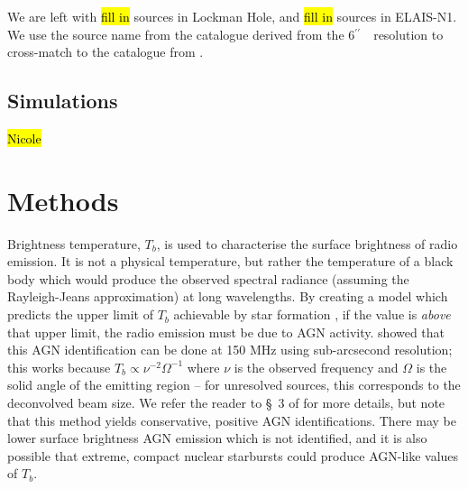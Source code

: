 \documentclass[usenatbib,fleqn,letters]{mnras}
\newcommand{\sarc}{$^{\prime\prime}\!\!$}
\begin{document}
We are left with \hl{fill in} sources in Lockman Hole, and \hl{fill in} sources in ELAIS-N1. We use the source name from the catalogue derived from the 6\sarc\ \ resolution to cross-match to the catalogue from . 

\subsection{Simulations}
\hl{Nicole}

\section{Methods}

Brightness temperature, $T_b$, is used to characterise the surface brightness of radio emission. It is not a physical temperature, but rather the temperature of a black body  which would produce the observed spectral radiance (assuming the Rayleigh-Jeans approximation) at long wavelengths. By creating a model which predicts the upper limit of $T_b$ achievable by star formation \citep[based on][]{condon_radio_1992}, if the value is \textit{above} that upper limit, the radio emission must be due to AGN activity.   showed that this AGN identification can be done at 150 MHz using sub-arcsecond resolution; this works because $T_b\propto\nu^{-2}\Omega^{-1}$ where $\nu$ is the observed frequency and $\Omega$ is the solid angle of the emitting region -- for unresolved sources, this corresponds to the deconvolved beam size. We refer the reader to \S~3 of  for more details, but note that this method yields conservative, positive AGN identifications. There may be lower surface brightness AGN emission which is not identified, and it is also possible \citep[although unlikely, according to][]{condon_radio_1992} that extreme, compact nuclear starbursts could produce AGN-like values of $T_b$. 
\end{document}
